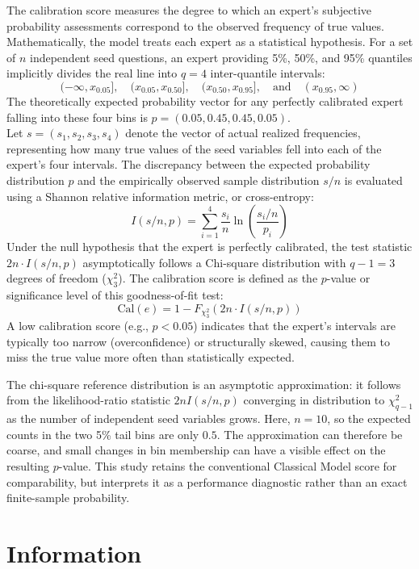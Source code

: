 The calibration score measures the degree to which an expert's subjective probability assessments correspond to the observed frequency of true values. Mathematically, the model treats each expert as a statistical hypothesis. For a set of $n$ independent seed questions, an expert providing 5\%, 50\%, and 95\% quantiles implicitly divides the real line into $q = 4$ inter-quantile intervals: 
\[
(-\infty, x_{0.05}], \quad (x_{0.05}, x_{0.50}], \quad (x_{0.50}, x_{0.95}], \quad \text{and} \quad (x_{0.95}, \infty)
\]
The theoretically expected probability vector for any perfectly calibrated expert falling into these four bins is $p = (0.05, 0.45, 0.45, 0.05)$.\\\newline
Let $s = (s_1, s_2, s_3, s_4)$ denote the vector of actual realized frequencies, representing how many true values of the seed variables fell into each of the expert's four intervals. The discrepancy between the expected probability distribution $p$ and the empirically observed sample distribution $s/n$ is evaluated using a Shannon relative information metric, or cross-entropy:
\[
I(s/n, p) = \sum_{i=1}^{4} \frac{s_i}{n} \ln\left(\frac{s_i/n}{p_i}\right)
\]
Under the null hypothesis that the expert is perfectly calibrated, the test statistic $2n \cdot I(s/n, p)$ asymptotically follows a Chi-square distribution with $q - 1 = 3$ degrees of freedom ($\chi^2_3$). The calibration score is defined as the $p$-value or significance level of this goodness-of-fit test:
\[
\text{Cal}(e) = 1 - F_{\chi^2_3}\left(2n \cdot I(s/n, p)\right)
\]
A low calibration score (e.g., $p < 0.05$) indicates that the expert's intervals are typically too narrow (overconfidence) or structurally skewed, causing them to miss the true value more often than statistically expected.

The chi-square reference distribution is an asymptotic approximation: it follows from the likelihood-ratio statistic $2nI(s/n,p)$ converging in distribution to $\chi^2_{q-1}$ as the number of independent seed variables grows. Here, $n=10$, so the expected counts in the two 5\% tail bins are only $0.5$. The approximation can therefore be coarse, and small changes in bin membership can have a visible effect on the resulting $p$-value. This study retains the conventional Classical Model score for comparability, but interprets it as a performance diagnostic rather than an exact finite-sample probability.

\section{Information}
\label{sec:information_score}


